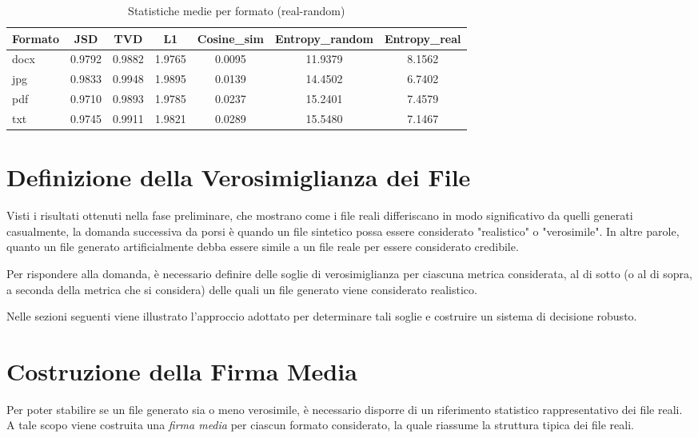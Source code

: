 \documentclass{report}
\begin{document}
\begin{table}[H]
\centering
\caption{Statistiche medie per formato (real-random)}
\label{tab:mean-real-random}
\renewcommand{\arraystretch}{1.25}
\setlength{\tabcolsep}{8pt}
\begin{tabular}{lcccccc}
\toprule
\textbf{Formato} & \textbf{JSD} & \textbf{TVD} & \textbf{L1} & \textbf{Cosine\_sim} & \textbf{Entropy\_random} & \textbf{Entropy\_real} \\
\midrule
docx & 0.9792 & 0.9882 & 1.9765 & 0.0095 & 11.9379 & 8.1562 \\
jpg  & 0.9833 & 0.9948 & 1.9895 & 0.0139 & 14.4502 & 6.7402 \\
pdf  & 0.9710 & 0.9893 & 1.9785 & 0.0237 & 15.2401 & 7.4579 \\
txt  & 0.9745 & 0.9911 & 1.9821 & 0.0289 & 15.5480 & 7.1467 \\
\bottomrule
\end{tabular}
\end{table}



\section{Definizione della Verosimiglianza dei File}

Visti i risultati ottenuti nella fase preliminare, che mostrano come i file reali differiscano in modo significativo da quelli generati casualmente,
la domanda successiva da porsi è quando un file sintetico possa essere considerato "realistico" o "verosimile".
In altre parole, quanto un file generato artificialmente debba essere simile a un file reale per essere considerato credibile.

\bigskip

Per rispondere alla domanda, è necessario definire delle soglie di verosimiglianza per ciascuna metrica considerata,
al di sotto (o al di sopra, a seconda della metrica che si considera) delle quali un file generato viene considerato realistico.

\bigskip

Nelle sezioni seguenti viene illustrato l’approccio adottato per determinare tali soglie e costruire un sistema di decisione robusto.


\section{Costruzione della Firma Media}

Per poter stabilire se un file generato sia o meno verosimile, è necessario disporre di un riferimento statistico rappresentativo dei file reali.
A tale scopo viene costruita una \emph{firma media} per ciascun formato considerato, la quale riassume la struttura tipica dei file reali.
\end{document}
